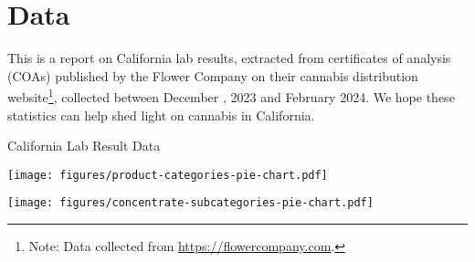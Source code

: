 \documentclass[../article.tex, 12pt]{subfiles}
\begin{document}
%


\section*{Data}
\label{sec:Data}
\pagestyle{regular}

This is a report on California lab results, extracted from certificates of analysis (COAs) published by the Flower Company on their cannabis distribution website\footnote[1]{Note: Data collected from \href{https://flowercompany.com}{https://flowercompany.com}.}, collected between December , 2023 and February  2024. We hope these statistics can help shed light on cannabis in California.

\vspace{1\baselineskip}

\noindent California Lab Result Data\\[0.25\baselineskip]
    
    
\vspace{2\baselineskip}

\noindent%
\begin{minipage}[t]{0.45\textwidth}

    \centering
    \texttt{[image: figures/product-categories-pie-chart.pdf]}

\end{minipage}\hspace{0.05\textwidth}
%
\begin{minipage}[t]{0.45\textwidth}

    \centering
    \texttt{[image: figures/concentrate-subcategories-pie-chart.pdf]}

\end{minipage}
\end{document}
